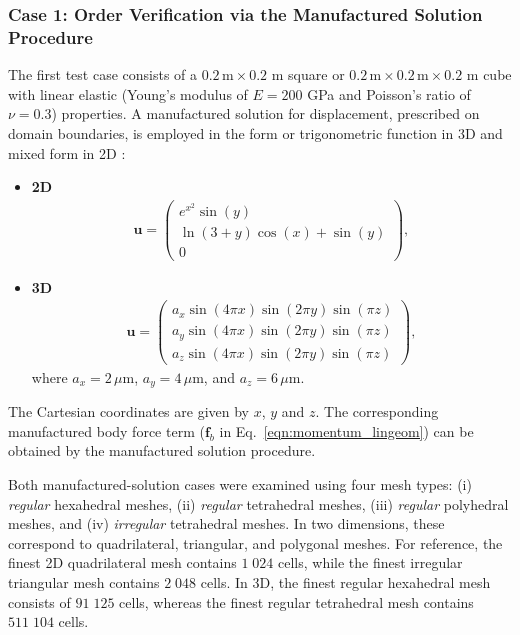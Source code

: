 \documentclass[review,3p]{elsarticle}
\newcommand{\bb}{\boldsymbol}
\begin{document}
\subsubsection{Case 1: Order Verification via the Manufactured Solution Procedure}
\label{case:mms}
%
The first test case consists of a  $0.2\,\text{m} \times 0.2$ m square or $0.2\,\text{m} \times 0.2\,\text{m} \times 0.2$ m cube with linear elastic (Young's modulus of $E = 200$ GPa and Poisson's ratio of $\nu = 0.3$) properties.
A manufactured solution for displacement, prescribed on domain boundaries, is employed in the form or trigonometric function in 3D \cite{Mazzanti2024} and mixed form in 2D \cite{Castrillo2022}:
%
\begin{itemize}
	\item[•] \textbf{2D}
	\begin{eqnarray}
		\bb{u} =
		\begin{pmatrix}
			e^{x^2}\sin(y)\\
			\ln(3+y)\cos(x)+\sin(y)\\
			0
		\end{pmatrix},
	\end{eqnarray}
	\item[•] \textbf{3D}
	\begin{eqnarray}
		\bb{u} =
		\begin{pmatrix}
			a_x \sin(4\pi x) \sin(2\pi y) \sin(\pi z) \\
			a_y \sin(4 \pi x) \sin(2 \pi y) \sin(\pi z) \\
			a_z \sin(4 \pi x) \sin(2 \pi y) \sin(\pi z)
		\end{pmatrix},
	\end{eqnarray}
	where $a_x = 2\,\mu$m, $a_y = 4\,\mu$m, and $a_z = 6\,\mu$m.
\end{itemize}
The Cartesian coordinates are given by $x$, $y$ and $z$.
The corresponding manufactured body force term ($\bb{f}_b$ in Eq.~\eqref{eqn:momentum_lingeom}) can be obtained by the manufactured solution procedure.

Both manufactured-solution cases were examined using four mesh types: (i) \emph{regular} hexahedral meshes, (ii) \emph{regular} tetrahedral meshes, (iii) \emph{regular} polyhedral meshes, and (iv) \emph{irregular} tetrahedral meshes. In two dimensions, these correspond to quadrilateral, triangular, and polygonal meshes. For reference, the finest 2D quadrilateral mesh contains $1\;024$ cells, while the finest irregular triangular mesh contains $2\;048$ cells. In 3D, the finest regular hexahedral mesh consists of $91\;125$ cells, whereas the finest regular tetrahedral mesh contains $511\;104$ cells.
\end{document}
